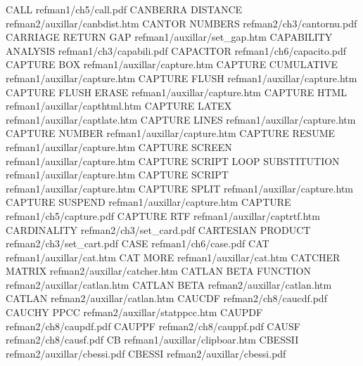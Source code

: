 CALL                                    refman1/ch5/call.pdf
CANBERRA DISTANCE                       refman2/auxillar/canbdist.htm
CANTOR NUMBERS                          refman2/ch3/cantornu.pdf
CARRIAGE RETURN GAP                     refman1/auxillar/set_gap.htm
CAPABILITY ANALYSIS                     refman1/ch3/capabili.pdf
CAPACITOR                               refman1/ch6/capacito.pdf
CAPTURE BOX                             refman1/auxillar/capture.htm
CAPTURE CUMULATIVE                      refman1/auxillar/capture.htm
CAPTURE FLUSH                           refman1/auxillar/capture.htm
CAPTURE FLUSH ERASE                     refman1/auxillar/capture.htm
CAPTURE HTML                            refman1/auxillar/capthtml.htm
CAPTURE LATEX                           refman1/auxillar/captlate.htm
CAPTURE LINES                           refman1/auxillar/capture.htm
CAPTURE NUMBER                          refman1/auxillar/capture.htm
CAPTURE RESUME                          refman1/auxillar/capture.htm
CAPTURE SCREEN                          refman1/auxillar/capture.htm
CAPTURE SCRIPT LOOP SUBSTITUTION        refman1/auxillar/capture.htm
CAPTURE SCRIPT                          refman1/auxillar/capture.htm
CAPTURE SPLIT                           refman1/auxillar/capture.htm
CAPTURE SUSPEND                         refman1/auxillar/capture.htm
CAPTURE                                 refman1/ch5/capture.pdf
CAPTURE RTF                             refman1/auxillar/captrtf.htm
CARDINALITY                             refman2/ch3/set_card.pdf
CARTESIAN PRODUCT                       refman2/ch3/set_cart.pdf
CASE                                    refman1/ch6/case.pdf
CAT                                     refman1/auxillar/cat.htm
CAT MORE                                refman1/auxillar/cat.htm
CATCHER MATRIX                          refman2/auxillar/catcher.htm
CATLAN BETA FUNCTION                    refman2/auxillar/catlan.htm
CATLAN BETA                             refman2/auxillar/catlan.htm
CATLAN                                  refman2/auxillar/catlan.htm
CAUCDF                                  refman2/ch8/caucdf.pdf
CAUCHY PPCC                             refman2/auxillar/statppcc.htm
CAUPDF                                  refman2/ch8/caupdf.pdf
CAUPPF                                  refman2/ch8/cauppf.pdf
CAUSF                                   refman2/ch8/causf.pdf
CB                                      refman1/auxillar/clipboar.htm
CBESSII                                 refman2/auxillar/cbessi.pdf
CBESSI                                  refman2/auxillar/cbessi.pdf

